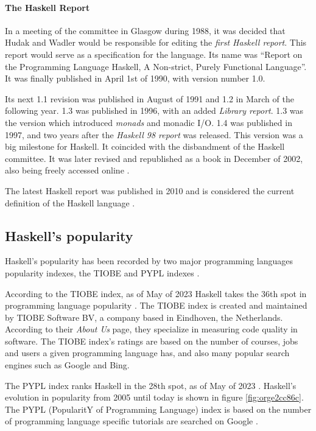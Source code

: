 \documentclass[a4paper, titlepage, twoside]{article}
\begin{document}
\paragraph*{The Haskell Report}
\label{sec:org586ebab}

In a meeting of the committee in Glasgow during 1988, it was decided that Hudak and Wadler would be responsible for editing the \emph{first Haskell report}. This report would serve as a specification for the language. Its name was ``Report on the Programming Language Haskell, A Non-strict, Purely Functional Language''. It was finally published in April 1st of 1990, with version number 1.0.

Its next 1.1 revision was published in August of 1991 and 1.2 in March of the following year. 1.3 was published in 1996, with an added \emph{Library report}. 1.3 was the version which introduced \emph{monads} and monadic I/O. 1.4 was published in 1997, and two years after the \emph{Haskell 98 report} was released. This version was a big milestone for Haskell. It coincided with the disbandment of the Haskell committee. It was later revised and republished as a book in December of 2002, also being freely accessed online \autocite{hudakHistoryHaskellBeing2007}.

The latest Haskell report was published in 2010 and is considered the current definition of the Haskell language \autocite{marlowHaskell2010Language2010,haskellwikiHaskellHaskellWiki2023}.

\subsection{Haskell's popularity}
\label{sec:orge463338}

Haskell's popularity has been recorded by two major programming languages popularity indexes, the TIOBE and PYPL indexes \autocites{carbonnellePYPLPopularitYProgramming2023}[][]{tiobeTIOBEIndex2023}.

According to the TIOBE index, as of May of 2023 Haskell takes the 36th spot in programming language popularity \autocite{tiobeTIOBEIndex2023}. The TIOBE index is created and maintained by TIOBE Software BV, a company based in Eindhoven, the Netherlands. According to their \emph{About Us} page, they specialize in measuring code quality in software. The TIOBE index's ratings are based on the number of courses, jobs and users a given programming language has, and also many popular search engines such as Google and Bing.

The PYPL index ranks Haskell in the 28th spot, as of May of 2023 \autocite{carbonnellePYPLPopularitYProgramming2023}. Haskell's evolution in popularity from 2005 until today is shown in figure \ref{fig:orge2cc86c}. The PYPL (PopularitY of Programming Language) index is based on the number of programming language specific tutorials are searched on Google \autocite{carbonnellePYPLPopularitYProgramming2023}.
\end{document}
